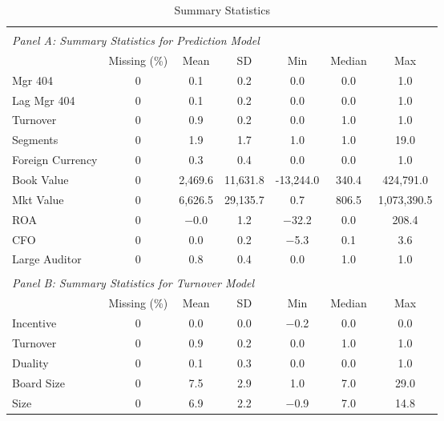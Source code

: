 \documentclass[12pt,english]{article}
\begin{document}
\begin{table}[ht]
\caption{Summary Statistics}
\label{tab:descriptives} 
\centering
\begin{threeparttable}
\begin{tabular}{lcccccc}
&&&&\\
\multicolumn{7}{l}{\emph{Panel A: Summary Statistics for Prediction Model}}\\
\toprule
   & Missing (\%) & Mean & SD & Min & Median & Max\\
\midrule
Mgr 404 & 0 & \num{0.1} & \num{0.2} & \num{0.0} & \num{0.0} & \num{1.0}\\
Lag Mgr 404 & 0 & \num{0.1} & \num{0.2} & \num{0.0} & \num{0.0} & \num{1.0}\\
Turnover & 0 & \num{0.9} & \num{0.2} & \num{0.0} & \num{1.0} & \num{1.0}\\
Segments & 0 & \num{1.9} & \num{1.7} & \num{1.0} & \num{1.0} & \num{19.0}\\
Foreign Currency & 0 & \num{0.3} & \num{0.4} & \num{0.0} & \num{0.0} & \num{1.0}\\
Book Value & 0 & 2,469.6 & 11,631.8 & -13,244.0 & \num{340.4} & 424,791.0\\
Mkt Value & 0 & 6,626.5 & 29,135.7 & \num{0.7} & \num{806.5} & 1,073,390.5\\
ROA & 0 & \num{-0.0} & \num{1.2} & \num{-32.2} & \num{0.0} & \num{208.4}\\
CFO  & 0 & \num{0.0} & \num{0.2} & \num{-5.3} & \num{0.1} & \num{3.6}\\
Large Auditor & 0 & \num{0.8} & \num{0.4} & \num{0.0} & \num{1.0} & \num{1.0}\\
&&&&\\
\multicolumn{7}{l}{\emph{Panel B: Summary Statistics for Turnover Model}}\\
\midrule
  & Missing (\%) & Mean & SD & Min & Median & Max\\
\midrule
Incentive & 0 & \num{0.0} & \num{0.0} & \num{-0.2} & \num{0.0} & \num{0.0}\\
Turnover & 0 & \num{0.9} & \num{0.2} & \num{0.0} & \num{1.0} & \num{1.0}\\
Duality & 0 & \num{0.1} & \num{0.3} & \num{0.0} & \num{0.0} & \num{1.0}\\
Board Size & 0 & \num{7.5} & \num{2.9} & \num{1.0} & \num{7.0} & \num{29.0}\\
Size & 0 & \num{6.9} & \num{2.2} & \num{-0.9} & \num{7.0} & \num{14.8}\\

\end{tabular}
\end{threeparttable}
\end{table}
\end{document}
